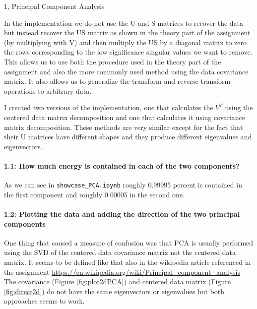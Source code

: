 \begin{task}{1, Principal Component Analysis}

In the implementation we do not use the U and S matrices to recover the data but instead recover the US matrix as shown in the theory part of the assignment (by multiplying with V) and then multiply the US by a diagonal matrix to zero the rows corresponding to the low significance singular values we want to remove. This allows us to use both the procedure used in the theory part of the assignment and also the more commonly used method using the data covariance matrix. It also allows us to generalize the transform and reverse transform operations to arbitrary data.

I created two versions of the implementation, one that calculates the $V^T$ using the centered data matrix decomposition and one that calculates it using covariance matrix decomposition. These methods are very similar except for the fact that their U matrices have different shapes and they produce different eigenvalues and eigenvectors.

\paragraph{1.1: How much energy is contained in each of the two components?}
As we can see in \verb+showcase_PCA.ipynb+ roughly 0.99995 percent is contained in the first component and roughly 0.00005 in the second one.

\paragraph{1.2: Plotting the data and adding the direction of the two principal components}

One thing that caused a measure of confusion was that PCA is usually performed using the SVD of the centered data covariance matrix not the centered data matrix. It seems to be defined like that also in the wikipedia article referenced in the assignment \href{https://en.wikipedia.org/wiki/Principal_component_analysis}{https://en.wikipedia.org/wiki/Principal\_component\_analysis} The covariance (Figure \ref{fig:plot2dPCA}) and centered data matrix (Figure \ref{fig:direct2d}) do not have the same eigenvectors or eigenvalues but both approaches seems to work.


\end{task}
